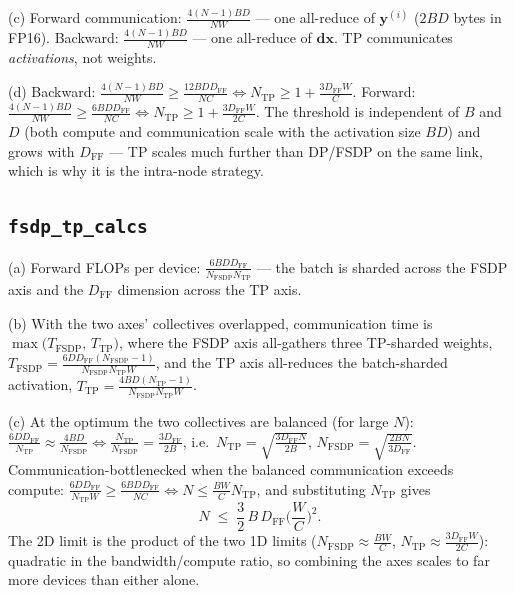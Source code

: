 \documentclass[11pt]{article}
\begin{document}
(c) Forward communication: $\frac{4(N-1)BD}{NW}$ --- one all-reduce of $\bm{y}^{(i)}$ ($2BD$ bytes
in FP16). Backward: $\frac{4(N-1)BD}{NW}$ --- one all-reduce of $\bm{dx}$. TP communicates
\emph{activations}, not weights.

(d) Backward: $\frac{4(N-1)BD}{NW} \ge \frac{12BDD_{\mathrm{FF}}}{NC} \iff N_{\mathrm{TP}} \ge
1 + \frac{3D_{\mathrm{FF}}W}{C}$. Forward: $\frac{4(N-1)BD}{NW} \ge \frac{6BDD_{\mathrm{FF}}}{NC}
\iff N_{\mathrm{TP}} \ge 1 + \frac{3D_{\mathrm{FF}}W}{2C}$. The threshold is independent of $B$ and
$D$ (both compute and communication scale with the activation size $BD$) and grows with
$D_{\mathrm{FF}}$ --- TP scales much further than DP/FSDP on the same link, which is why it is the
intra-node strategy.

\subsection{\texttt{fsdp\_tp\_calcs}}

(a) Forward FLOPs per device: $\frac{6BDD_{\mathrm{FF}}}{N_{\mathrm{FSDP}} N_{\mathrm{TP}}}$ ---
the batch is sharded across the FSDP axis and the $D_{\mathrm{FF}}$ dimension across the TP axis.

(b) With the two axes' collectives overlapped, communication time is
$\max\!\big(T_{\mathrm{FSDP}},\,T_{\mathrm{TP}}\big)$, where the FSDP axis all-gathers three
TP-sharded weights, $T_{\mathrm{FSDP}} = \frac{6DD_{\mathrm{FF}}(N_{\mathrm{FSDP}}-1)}
{N_{\mathrm{FSDP}} N_{\mathrm{TP}} W}$, and the TP axis all-reduces the batch-sharded activation,
$T_{\mathrm{TP}} = \frac{4BD(N_{\mathrm{TP}}-1)}{N_{\mathrm{FSDP}} N_{\mathrm{TP}} W}$.

(c) At the optimum the two collectives are balanced (for large $N$):
$\frac{6DD_{\mathrm{FF}}}{N_{\mathrm{TP}}} \approx \frac{4BD}{N_{\mathrm{FSDP}}} \iff
\frac{N_{\mathrm{TP}}}{N_{\mathrm{FSDP}}} = \frac{3D_{\mathrm{FF}}}{2B}$, i.e.\
$N_{\mathrm{TP}} = \sqrt{\tfrac{3D_{\mathrm{FF}}N}{2B}}$, $N_{\mathrm{FSDP}} =
\sqrt{\tfrac{2BN}{3D_{\mathrm{FF}}}}$. Communication-bottlenecked when the balanced communication
exceeds compute: $\frac{6DD_{\mathrm{FF}}}{N_{\mathrm{TP}}W} \ge \frac{6BDD_{\mathrm{FF}}}{NC}
\iff N \le \frac{BW}{C}N_{\mathrm{TP}}$, and substituting $N_{\mathrm{TP}}$ gives
\[
N \;\le\; \frac{3}{2}\,B\,D_{\mathrm{FF}}\Big(\frac{W}{C}\Big)^{2}.
\]
The 2D limit is the product of the two 1D limits ($N_{\mathrm{FSDP}} \approx \frac{BW}{C}$,
$N_{\mathrm{TP}} \approx \frac{3D_{\mathrm{FF}}W}{2C}$): quadratic in the bandwidth/compute ratio,
so combining the axes scales to far more devices than either alone.
\end{document}

